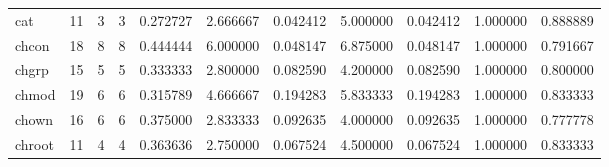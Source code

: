 \begin{longtable}{lrrrrrrrrrr}
cat       &                                      11 &                  3 &                                 3 &                                   0.272727 &                               2.666667 &                                     0.042412 &                          5.000000 &                                0.042412 &                           1.000000 &                                           0.888889 \\
chcon     &                                      18 &                  8 &                                 8 &                                   0.444444 &                               6.000000 &                                     0.048147 &                          6.875000 &                                0.048147 &                           1.000000 &                                           0.791667 \\
chgrp     &                                      15 &                  5 &                                 5 &                                   0.333333 &                               2.800000 &                                     0.082590 &                          4.200000 &                                0.082590 &                           1.000000 &                                           0.800000 \\
chmod     &                                      19 &                  6 &                                 6 &                                   0.315789 &                               4.666667 &                                     0.194283 &                          5.833333 &                                0.194283 &                           1.000000 &                                           0.833333 \\
chown     &                                      16 &                  6 &                                 6 &                                   0.375000 &                               2.833333 &                                     0.092635 &                          4.000000 &                                0.092635 &                           1.000000 &                                           0.777778 \\
chroot    &                                      11 &                  4 &                                 4 &                                   0.363636 &                               2.750000 &                                     0.067524 &                          4.500000 &                                0.067524 &                           1.000000 &                                           0.833333 \\

\end{longtable}
